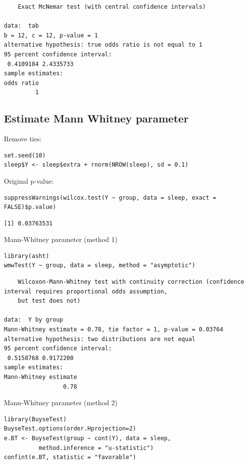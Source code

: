 \documentclass{article}
\begin{document}
\begin{verbatim}
	Exact McNemar test (with central confidence intervals)

data:  tab
b = 12, c = 12, p-value = 1
alternative hypothesis: true odds ratio is not equal to 1
95 percent confidence interval:
 0.4109184 2.4335733
sample estimates:
odds ratio 
         1
\end{verbatim}

\subsection{Estimate Mann Whitney parameter}
\label{sec:org13b0cc6}

Remove ties:
\lstset{language=r,label= ,caption= ,captionpos=b,numbers=none}
\begin{lstlisting}
set.seed(10)
sleep$Y <- sleep$extra + rnorm(NROW(sleep), sd = 0.1)
\end{lstlisting}

Original p-value:
\lstset{language=r,label= ,caption= ,captionpos=b,numbers=none}
\begin{lstlisting}
suppressWarnings(wilcox.test(Y ~ group, data = sleep, exact = FALSE)$p.value)
\end{lstlisting}

\begin{verbatim}
[1] 0.03763531
\end{verbatim}

Mann-Whitney parameter (method 1)
\lstset{language=r,label= ,caption= ,captionpos=b,numbers=none}
\begin{lstlisting}
library(asht)
wmwTest(Y ~ group, data = sleep, method = "asymptotic")
\end{lstlisting}

\begin{verbatim}
	Wilcoxon-Mann-Whitney test with continuity correction (confidence interval requires proportional odds assumption,
	but test does not)

data:  Y by group
Mann-Whitney estimate = 0.78, tie factor = 1, p-value = 0.03764
alternative hypothesis: two distributions are not equal
95 percent confidence interval:
 0.5158768 0.9172200
sample estimates:
Mann-Whitney estimate 
                 0.78
\end{verbatim}

Mann-Whitney parameter (method 2)
\lstset{language=r,label= ,caption= ,captionpos=b,numbers=none}
\begin{lstlisting}
library(BuyseTest)
BuyseTest.options(order.Hprojection=2)
e.BT <- BuyseTest(group ~ cont(Y), data = sleep, 
		  method.inference = "u-statistic")
confint(e.BT, statistic = "favorable")
\end{lstlisting}
\end{document}
